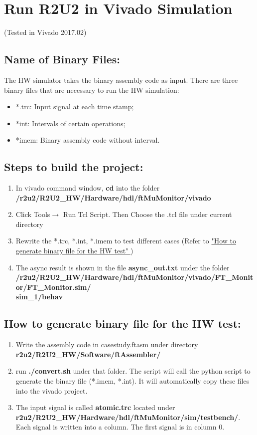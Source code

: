 \section{Run R2U2 in Vivado Simulation}
(Tested in Vivado 2017.02)
\subsection{Name of Binary Files:}
The HW simulator takes the binary assembly code as input. There are three binary files that are necessary to run the HW simulation:
\begin{itemize}
\item *.trc: Input signal at each time stamp;
\item *int: Intervals of certain operations;
\item *imem: Binary assembly code without interval.
\end{itemize}

\subsection{Steps to build the project:}
\begin{enumerate}
  \item In vivado command window, \textbf{cd} into the folder\\
  \textbf{/r2u2/R2U2\_HW/Hardware/hdl/ftMuMonitor/vivado}
  \item Click Tools$\rightarrow$ Run Tcl Script. Then Choose the .tcl file under current directory
  \item Rewrite the *.trc, *.int, *.imem to test different cases (Refer to \hyperlink{gb}{"How to generate binary file for the HW test" })
  \item The async result is shown in the file \textbf{async\_out.txt} under the folder\\
  \textbf{/r2u2/R2U2\_HW/Hardware/hdl/ftMuMonitor/vivado/FT\_Monitor/FT\_Monitor.sim/\\
  sim\_1/behav}
\end{enumerate}
\hypertarget{gb}{\subsection{How to generate binary file for the HW test:}}
\begin{enumerate}
	\item Write the assembly code in casestudy.ftasm under directory\\
 \textbf{r2u2/R2U2\_HW/Software/ftAssembler/}
	\item run \textbf{./convert.sh} under that folder. The script will call the python script to generate the binary file (*.imem, *.int). It will automatically copy these files into the vivado project.
	\item The input signal is called \textbf{atomic.trc} located under \\
\textbf{r2u2/R2U2\_HW/Hardware/hdl/ftMuMonitor/sim/testbench/}. Each signal is written into a column. The first signal is in column 0.
\end{enumerate}

\clearpage